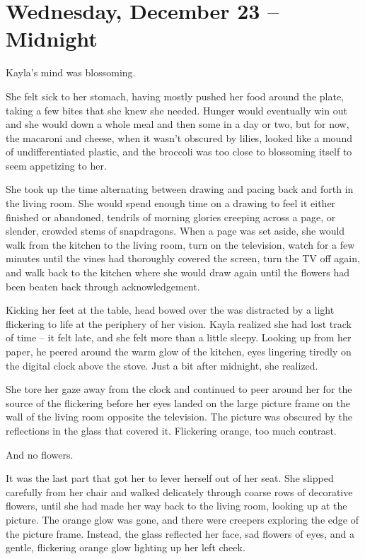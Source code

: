 \chapter{Wednesday, December 23 -- Midnight}

Kayla's mind was blossoming.

She felt sick to her stomach, having mostly pushed her food around the plate, taking a few bites that she knew she needed.  Hunger would eventually win out and she would down a whole meal and then some in a day or two, but for now, the macaroni and cheese, when it wasn't obscured by lilies, looked like a mound of undifferentiated plastic, and the broccoli was too close to blossoming itself to seem appetizing to her.

She took up the time alternating between drawing and pacing back and forth in the living room.  She would spend enough time on a drawing to feel it either finished or abandoned, tendrils of morning glories creeping across a page, or slender, crowded stems of snapdragons.  When a page was set aside, she would walk from the kitchen to the living room, turn on the television, watch for a few minutes until the vines had thoroughly covered the screen, turn the TV off again, and walk back to the kitchen where she would draw again until the flowers had been beaten back through acknowledgement.

Kicking her feet at the table, head bowed over the was distracted by a light flickering to life at the periphery of her vision.  Kayla realized she had lost track of time -- it felt late, and she felt more than a little sleepy.  Looking up from her paper, he peered around the warm glow of the kitchen, eyes lingering tiredly on the digital clock above the stove.  Just a bit after midnight, she realized.

She tore her gaze away from the clock and continued to peer around her for the source of the flickering before her eyes landed on the large picture frame on the wall of the living room opposite the television.  The picture was obscured by the reflections in the glass that covered it.  Flickering orange, too much contrast.

And no flowers.

It was the last part that got her to lever herself out of her seat.  She slipped carefully from her chair and walked delicately through coarse rows of decorative flowers, until she had made her way back to the living room, looking up at the picture.  The orange glow was gone, and there were creepers exploring the edge of the picture frame.  Instead, the glass reflected her face, sad flowers of eyes, and a gentle, flickering orange glow lighting up her left cheek.

